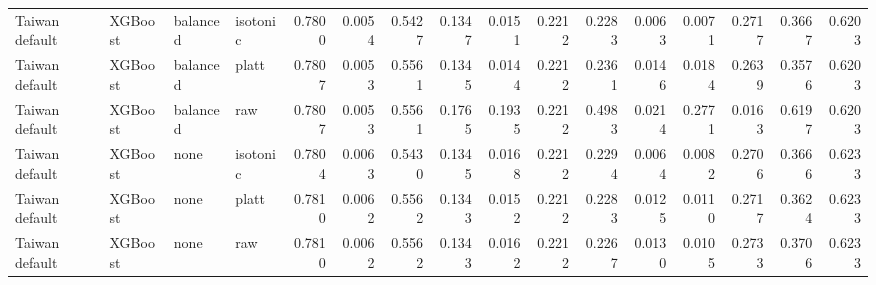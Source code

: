 \begin{table}[t]
{\begin{tabular}{llllrrrrrrrrrrrr}
$$Taiwan default & XGBoost & balanced & isotonic & 0.7800 & 0.0054 & 0.5427 & 0.1347 & 0.0151 & 0.2212 & 0.2283 & 0.0063 & 0.0071 & 0.2717 & 0.3667 & 0.6203 \\
Taiwan default & XGBoost & balanced & platt & 0.7807 & 0.0053 & 0.5561 & 0.1345 & 0.0144 & 0.2212 & 0.2361 & 0.0146 & 0.0184 & 0.2639 & 0.3576 & 0.6203 \\
Taiwan default & XGBoost & balanced & raw & 0.7807 & 0.0053 & 0.5561 & 0.1765 & 0.1935 & 0.2212 & 0.4983 & 0.0214 & 0.2771 & 0.0163 & 0.6197 & 0.6203 \\
Taiwan default & XGBoost & none & isotonic & 0.7804 & 0.0063 & 0.5430 & 0.1345 & 0.0168 & 0.2212 & 0.2294 & 0.0064 & 0.0082 & 0.2706 & 0.3666 & 0.6233 \\
Taiwan default & XGBoost & none & platt & 0.7810 & 0.0062 & 0.5562 & 0.1343 & 0.0152 & 0.2212 & 0.2283 & 0.0125 & 0.0110 & 0.2717 & 0.3624 & 0.6233 \\
Taiwan default & XGBoost & none & raw & 0.7810 & 0.0062 & 0.5562 & 0.1343 & 0.0162 & 0.2212 & 0.2267 & 0.0130 & 0.0105 & 0.2733 & 0.3706 & 0.6233 \\
\bottomrule
\end{tabular}}
\end{table}
